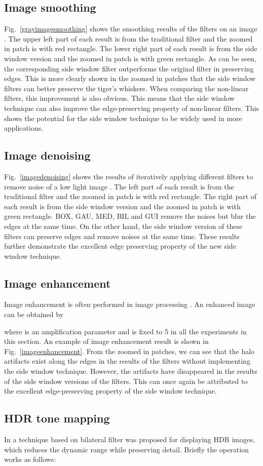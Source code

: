 \documentclass[10pt,twocolumn,letterpaper]{article}
\begin{document}
\subsection{Image smoothing}
Fig.~\ref{grayimagesmoothing} shows the smoothing results of the filters on an image \cite{ntire}. The upper left part of each result is from the traditional filter and the zoomed in patch is with red rectangle. The lower right part of each result is from the side window version and the zoomed in patch is with green rectangle. As can be seen, the corresponding side window filter outperforms the original filter in preserving edges. This is more clearly shown in the zoomed in patches that the side window filters can better preserve the tiger's whiskers. When comparing the non-linear filters, this improvement is also obvious. This means that the side window technique can also improve the edge-preserving property of non-linear filters. This shows the potential for the side window technique to be widely used in more applications.
\subsection{Image denoising}
Fig.~\ref{imagedenoising} shows the results of iteratively applying different filters to remove noise of a low light image \cite{renoir}. The left part of each result is from the traditional filter and the zoomed in patch is with red rectangle. The right part of each result is from the side window version and the zoomed in patch is with green rectangle. BOX, GAU, MED, BIL and GUI remove the noises but blur the edges at the same time. On the other hand, the side window version of these filters can preserve edges and remove noises at the same time. These results further demonstrate the excellent edge preserving property of the new side window technique. \subsection{Image enhancement}
Image enhancement is often performed in image processing \cite{gf}\cite{wgf}. An enhanced image can be obtained by 

where  is an amplification parameter and is fixed to 5 in all the experiments in this section. An example of image enhancement result is shown in Fig.~\ref{imageenhancement}. From the zoomed in patches, we can see that the halo artifacts exist along the edges in the results of the filters without implementing the side window technique. However, the artifacts have disappeared in the results of the side window versions of the filters. This can once again be attributed to the excellent edge-preserving property of the side window technique. \subsection{HDR tone mapping}
In \cite{fbf} a technique based on bilateral filter was proposed for displaying HDR images, which reduces the dynamic range while preserving detail. Briefly the operation works as follows:
\end{document}
